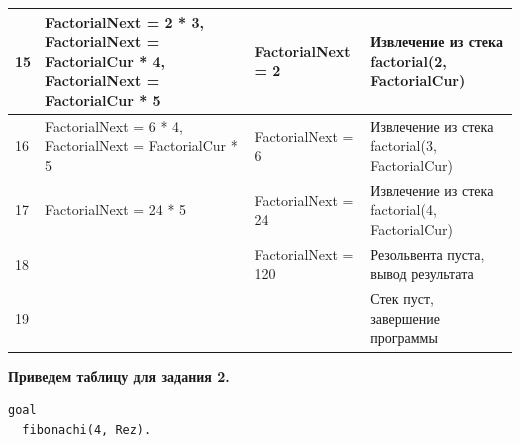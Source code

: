 \documentclass[a4paper,14pt]{extreport} %
\begin{document}
\begin{longtable}{|p{0.5cm}|p{5cm}|p{6cm}|p{5.5cm}|}
	15 & FactorialNext = 2 * 3, FactorialNext = FactorialCur * 4, FactorialNext = FactorialCur * 5 &  FactorialNext = 2& Извлечение из стека factorial(2, FactorialCur) \\ \hline
	
	16 & FactorialNext = 6 * 4, FactorialNext = FactorialCur * 5 &  FactorialNext = 6& Извлечение из стека factorial(3, FactorialCur) \\ \hline
	
	17 & FactorialNext = 24 * 5 &  FactorialNext = 24& Извлечение из стека factorial(4, FactorialCur) \\ \hline
	
	18 &  &  FactorialNext = 120& Резольвента пуста, вывод результата \\ \hline
	
	19 &  &  & Стек пуст, завершение программы \\ \hline

\end{longtable}

\hfill

\textbf{Приведем таблицу для задания 2. }
\begin{lstlisting}
goal
  fibonachi(4, Rez).
\end{lstlisting}
\end{document}

